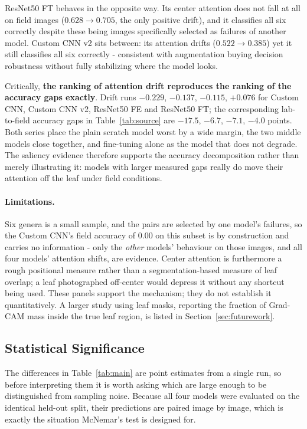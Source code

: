 \documentclass[12pt,a4paper]{article}
\begin{document}
ResNet50 FT behaves in the opposite way. Its center attention does not fall at all on field images ($0.628 \rightarrow 0.705$, the only positive drift), and it classifies all six correctly despite these being images specifically selected as failures of another model. Custom CNN v2 sits between: its attention drifts ($0.522 \rightarrow 0.385$) yet it still classifies all six correctly - consistent with augmentation buying decision robustness without fully stabilizing where the model looks.

Critically, \textbf{the ranking of attention drift reproduces the ranking of the accuracy gaps exactly}. Drift runs $-0.229$, $-0.137$, $-0.115$, $+0.076$ for Custom CNN, Custom CNN v2, ResNet50 FE and ResNet50 FT; the corresponding lab-to-field accuracy gaps in Table~\ref{tab:source} are $-17.5$, $-6.7$, $-7.1$, $-4.0$ points. Both series place the plain scratch model worst by a wide margin, the two middle models close together, and fine-tuning alone as the model that does not degrade. The saliency evidence therefore supports the accuracy decomposition rather than merely illustrating it: models with larger measured gaps really do move their attention off the leaf under field conditions.

\paragraph{Limitations.} Six genera is a small sample, and the pairs are selected by one model's failures, so the Custom CNN's field accuracy of $0.00$ on this subset is by construction and carries no information - only the \emph{other} models' behaviour on those images, and all four models' attention shifts, are evidence. Center attention is furthermore a rough positional measure rather than a segmentation-based measure of leaf overlap; a leaf photographed off-center would depress it without any shortcut being used. These panels support the mechanism; they do not establish it quantitatively. A larger study using leaf masks, reporting the fraction of Grad-CAM mass inside the true leaf region, is listed in Section~\ref{sec:futurework}.

\subsection{Statistical Significance}
\label{sec:significance}
The differences in Table~\ref{tab:main} are point estimates from a single run, so before interpreting them it is worth asking which are large enough to be distinguished from sampling noise. Because all four models were evaluated on the identical held-out split, their predictions are paired image by image, which is exactly the situation McNemar's test is designed for.
\end{document}
